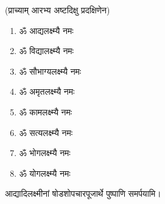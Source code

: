 (प्राच्याम् आरभ्य अष्टदिक्षु प्रदक्षिणेन)

\begin{multicols}{2}
\begin{enumerate}
\item ॐ आद्यलक्ष्म्यै नमः
\item ॐ विद्यालक्ष्म्यै नमः
\item ॐ सौभाग्यलक्ष्म्यै नमः
\item ॐ अमृतलक्ष्म्यै नमः
\item ॐ कामलक्ष्म्यै नमः 
\item ॐ सत्यलक्ष्म्यै नमः
\item ॐ भोगलक्ष्म्यै नमः
\item ॐ योगलक्ष्म्यै नमः
\end{enumerate}
\end{multicols}

आद्यादिलक्ष्मीनां षोडशोपचारपूजार्थे पुष्पाणि समर्पयामि।

